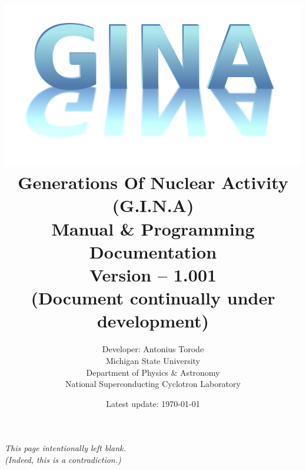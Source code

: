 \documentclass[openany,a4paper,11pt]{book}
\title{\includegraphics[scale =0.5]{./Images/gina.png} \\ Generations Of Nuclear Activity (G.I.N.A) \\  Manual \& Programming Documentation \\ Version -- 1.001 \\ (Document continually under development) \\ \vspace{1cm}  
}
\author{Developer: Antonius Torode \\ Michigan State University \\ Department of Physics \& Astronomy \\ National Superconducting Cyclotron Laboratory}
\date{Latest update: \today}
\begin{document}
\frontmatter
\maketitle

\tableofcontents
\newpage
\vspace*{\fill}
\begin{center}
	\textit{This page intentionally left blank. \\ (Indeed, this is a contradiction.)}
\end{center}
\vspace*{\fill}

\mainmatter
\pagestyle{fancy}
\fancyhf{}
\fancyhead[RO, LE]{\thepage}







\backmatter


\end{document}
